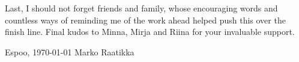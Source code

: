 \documentclass[12pt,a4paper,oneside,pdftex]{report}
\newcommand{\DATE}{\today}
\newcommand{\AUTHOR}{Marko Raatikka}
\begin{document}
Last, I should not forget friends and family, whose encouraging words and countless ways of reminding me of the work ahead helped push this over the finish line. Final kudos to Minna, Mirja and Riina for your invaluable support.



\vskip 10mm

\noindent Espoo, \DATE
\vskip 5mm
\noindent\AUTHOR

\cleardoublepage




\cleardoublepage

\begingroup
\makeatletter
\def\@makeschapterhead#1{%
  {\parindent \z@ \raggedright
    \normalfont
    \interlinepenalty\@M
    \Huge \bfseries  #1\par\nobreak
    \vskip 40\p@
  }}
\makeatother

\tableofcontents
\endgroup


\cleardoublepage
\listoffigures

\label{pages-prelude}

\cleardoublepage
\end{document}
